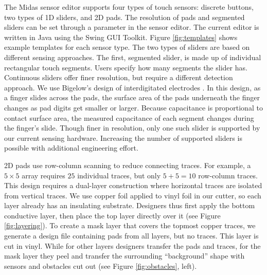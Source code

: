 The Midas sensor editor supports four types of touch sensors:
discrete buttons, two types of 1D sliders, and 2D pads. The
resolution of pads and segmented sliders can be set through a
parameter in the sensor editor. The current editor is written in
Java using the Swing GUI Toolkit. Figure \ref{fig:templates} shows example
templates for each sensor type. The two types of sliders are
based on different sensing approaches. The first, segmented
slider, is made up of individual rectangular touch segments.
Users specify how many segments the slider has. Continuous
sliders offer finer resolution, but require a different detection
approach. We use Bigelow's design of interdigitated electrodes
\cite{bigelow-interdigitated}. In this design, as a finger slides across the pads,
the surface area of the pads underneath the finger changes as
pad digits get smaller or larger. Because capacitance is proportional
to contact surface area, the measured capacitance of
each segment changes during the finger's slide. Though finer
in resolution, only one such slider is supported by our current
sensing hardware. Increasing the number of supported
sliders is possible with additional engineering effort.

2D pads use row-column scanning to reduce connecting traces.
For example, a $5 × 5$ array requires $25$ individual traces, but
only $5 + 5 = 10$ row-column traces. This design requires a
dual-layer construction where horizontal traces are isolated
from vertical traces. We use copper foil applied to vinyl foil
in our cutter, so each layer already has an insulating substrate.
Designers thus first apply the bottom conductive layer,
then place the top layer directly over it (see Figure \ref{fig:layering}).
To create a mask layer that covers the topmost copper traces,
we generate a design file containing pads from all layers, but
no traces. This layer is cut in vinyl. While for other layers
designers transfer the pads and traces, for the mask layer they
peel and transfer the surrounding “background” shape with
sensors and obstacles cut out (see Figure \ref{fig:obstacles}, left).


